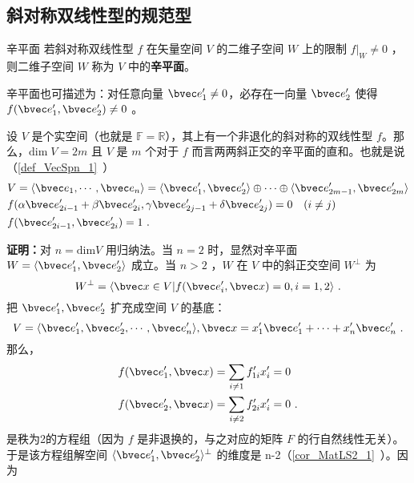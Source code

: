  \subsection{斜对称双线性型的规范型}
 \begin{definition}{辛平面}
 若斜对称双线性型 $f$ 在矢量空间 $V$ 的二维子空间 $W$ 上的限制 $f|_W\neq0$ ，则二维子空间 $W$ 称为 $V$ 中的\textbf{辛平面}。
 \end{definition}
 辛平面也可描述为：对任意向量 $\bvec e'_1\neq0$，必存在一向量 $\bvec e'_2$ 使得 $f(\bvec e'_1,\bvec e'_2)\neq0$ 。
 \begin{theorem}{}
 设 $V$ 是个实空间（也就是 $\mathbb{F}=\mathbb{R}$），其上有一个非退化的斜对称的双线性型 $f$。那么，$\mathrm{dim}\;V=2m$ 且 $V$ 是 $m$ 个对于 $f$ 而言两两斜正交的辛平面的直和。也就是说（\autoref{def_VecSpn_1}~）
 \begin{equation}
 \begin{aligned}
 &V=\langle\bvec e_1,\cdots,\bvec e_n\rangle=\langle\bvec e'_1,\bvec e'_2\rangle\oplus\cdots\oplus\langle\bvec e'_{2m-1},\bvec e'_{2m}\rangle\\
&f(\alpha\bvec e'_{2i-1}+\beta\bvec e'_{2i},\gamma\bvec e'_{2j-1}+\delta\bvec e'_{2j})=0\quad (i\neq j)~\\
 &f(\bvec e'_{2i-1},\bvec e'_{2i})=1~.
 \end{aligned}
 \end{equation}

 \end{theorem}
\textbf{证明：}对 $n=\mathrm{dim} V$ 用归纳法。当 $n=2$ 时，显然对辛平面 $W=\langle \bvec e'_1,\bvec e'_2\rangle$ 成立。当 $n>2$ ，$W$ 在 $V$ 中的斜正交空间 $W^{\perp}$ 为
\begin{equation}
W^{\perp}=\langle\bvec x\in V|f(\bvec e'_i,\bvec x)=0,i=1,2\rangle~.
\end{equation}
把 $\bvec e'_1,\bvec e'_2$ 扩充成空间 $V$ 的基底：
\begin{equation}
V=\langle \bvec e'_1,\bvec e'_2,\cdots,\bvec e'_n\rangle, \bvec x=x'_1\bvec e'_1+\cdots+x'_n\bvec e'_n~.
\end{equation}
那么，
\begin{equation}
\begin{aligned}
&f(\bvec e'_1,\bvec x)=\sum_{i\neq 1}f'_{1i}x'_i=0\\
&f(\bvec e'_2,\bvec x)=\sum_{i\neq 2}f'_{2i}x'_i=0~.
\end{aligned}
\end{equation}
是秩为2的方程组（因为 $f$ 是非退换的，与之对应的矩阵 $F$ 的行自然线性无关）。于是该方程组解空间 $\langle\bvec e'_1,\bvec e'_2\rangle^{\perp}$ 的维度是 n-2（\autoref{cor_MatLS2_1}~）。因为
